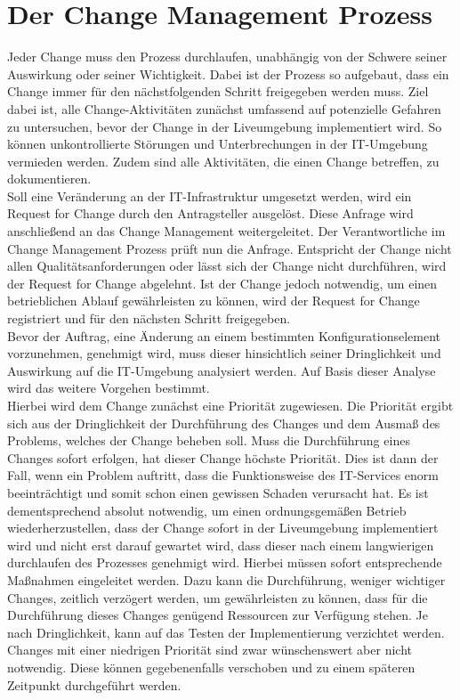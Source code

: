 \section{Der Change Management Prozess}
\vspace{-0.1cm}
Jeder Change muss den Prozess durchlaufen, unabhängig von der Schwere  seiner Auswirkung oder seiner Wichtigkeit. Dabei ist der Prozess so aufgebaut, dass ein Change immer für den nächstfolgenden Schritt freigegeben werden muss. Ziel dabei ist, alle Change-Aktivitäten zunächst umfassend auf potenzielle Gefahren zu untersuchen, bevor der Change in der Liveumgebung implementiert wird. So können unkontrollierte Störungen und Unterbrechungen in der IT-Umgebung vermieden werden. Zudem sind alle Aktivitäten, die einen Change betreffen, zu dokumentieren. 
\\
Soll eine Veränderung an der IT-Infrastruktur umgesetzt werden, wird ein Request for Change durch den Antragsteller ausgelöst. Diese Anfrage wird anschließend an das Change Management weitergeleitet. Der Verantwortliche im Change Management Prozess prüft nun die Anfrage. Entspricht der Change nicht allen Qualitätsanforderungen oder lässt sich der Change nicht durchführen, wird der Request for Change abgelehnt. Ist der Change jedoch notwendig, um einen betrieblichen Ablauf gewährleisten zu können, wird der Request for Change registriert und für den nächsten Schritt freigegeben. 
\\
Bevor der Auftrag, eine Änderung an einem bestimmten Konfigurationselement vorzunehmen, genehmigt wird, muss dieser hinsichtlich seiner Dringlichkeit und Auswirkung auf die IT-Umgebung analysiert werden. Auf Basis dieser Analyse wird das weitere Vorgehen bestimmt. 
\\
Hierbei wird dem Change zunächst eine Priorität zugewiesen. Die Priorität ergibt sich aus der Dringlichkeit der Durchführung des Changes und dem Ausmaß des Problems, welches der Change beheben soll. Muss die Durchführung eines Changes sofort erfolgen, hat dieser Change höchste Priorität. Dies ist dann der Fall, wenn ein Problem auftritt, dass die Funktionsweise des IT-Services enorm beeinträchtigt und somit schon einen gewissen Schaden verursacht hat. Es ist dementsprechend absolut notwendig, um einen ordnungsgemäßen Betrieb wiederherzustellen, dass der Change sofort in der Liveumgebung implementiert wird und nicht erst darauf gewartet wird, dass dieser nach einem langwierigen durchlaufen des Prozesses genehmigt wird. Hierbei müssen sofort entsprechende Maßnahmen eingeleitet werden. Dazu kann die Durchführung, weniger wichtiger Changes, zeitlich verzögert werden, um gewährleisten zu können, dass für die Durchführung dieses Changes genügend Ressourcen zur Verfügung stehen. Je nach Dringlichkeit, kann auf das Testen der Implementierung verzichtet werden. Changes mit einer niedrigen Priorität sind zwar wünschenswert aber nicht notwendig. Diese können gegebenenfalls verschoben und zu einem späteren Zeitpunkt durchgeführt werden.
